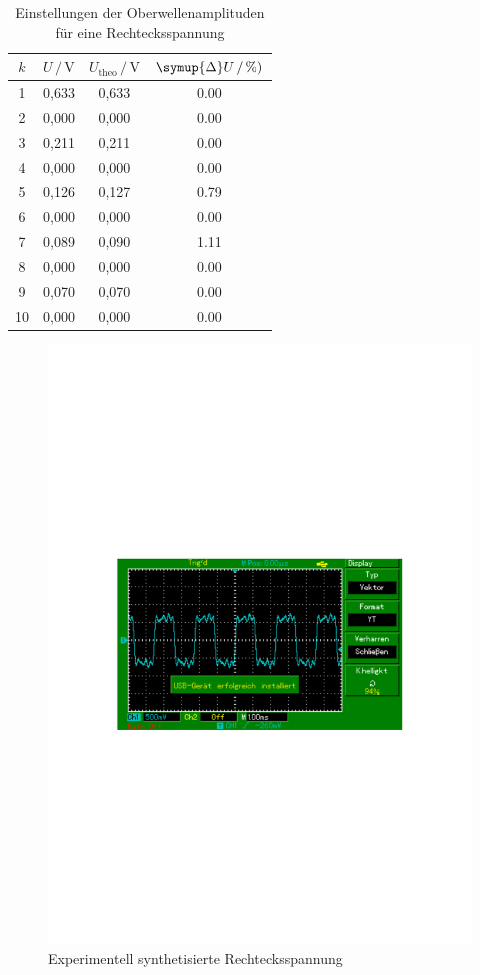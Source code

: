 \begin{table}
    \centering
    \caption{Einstellungen der Oberwellenamplituden für eine Rechtecksspannung}
    \label{tab:Messdaten5}
    \begin{tabular}{c c c c}
    \toprule
    $k$ & $U \,/\, \si{\volt}$ & $U_\text{theo} \,/\, \si{\volt}$ & $\symup{\Delta}U \,/\, \si{\percent})$ \\
    \midrule
     1 & 0,633 & 0,633 & 0.00 \\
     2 & 0,000 & 0,000 & 0.00 \\
     3 & 0,211 & 0,211 & 0.00 \\
     4 & 0,000 & 0,000 & 0.00 \\
     5 & 0,126 & 0,127 & 0.79 \\
     6 & 0,000 & 0,000 & 0.00 \\
     7 & 0,089 & 0,090 & 1.11 \\
     8 & 0,000 & 0,000 & 0.00 \\
     9 & 0,070 & 0,070 & 0.00 \\
    10 & 0,000 & 0,000 & 0.00 \\
    \bottomrule
    \end{tabular}
\end{table}

\begin{figure}
    \centering
    \includegraphics[scale=0.7]{content/MAP002.pdf}
    \caption{Experimentell synthetisierte Rechtecksspannung}
    \label{fig:Ex2}
\end{figure}



